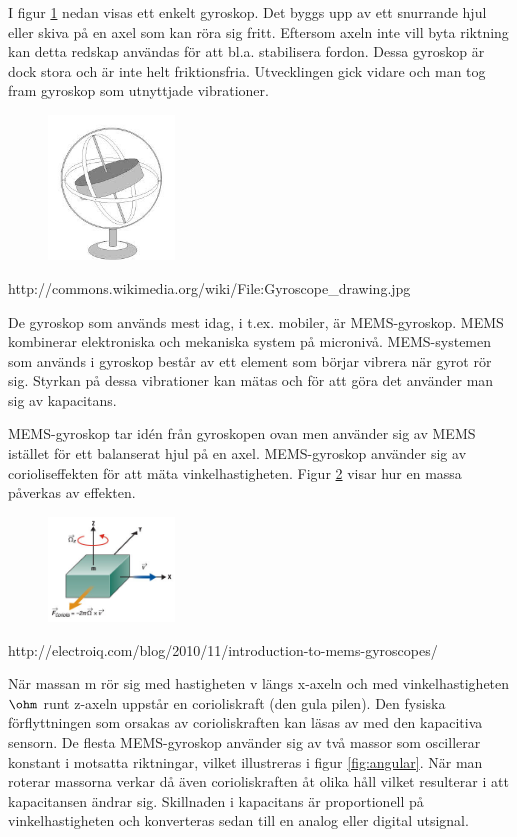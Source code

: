 \documentclass[a4paper,12pt,fleqn]{article}
\begin{document}
I figur \ref{fig:gyro} nedan visas ett enkelt gyroskop. Det byggs upp av ett snurrande hjul eller skiva på en axel som kan röra sig fritt. Eftersom axeln inte vill byta riktning kan detta redskap användas för att bl.a. stabilisera fordon. Dessa gyroskop är dock stora och är inte helt friktionsfria. Utvecklingen gick vidare och man tog fram gyroskop som utnyttjade vibrationer.

\begin{figure}[h]
\label{fig:gyro}
\caption{}
\includegraphics[width=0.3\textwidth]
{gyro.jpeg}
\end{figure}
http://commons.wikimedia.org/wiki/File:Gyroscope_drawing.jpg

De gyroskop som används mest idag, i t.ex. mobiler, är MEMS-gyroskop. MEMS kombinerar elektroniska och mekaniska system på micronivå. MEMS-systemen som används i gyroskop består av ett element som börjar vibrera när gyrot rör sig. Styrkan på dessa vibrationer kan mätas och för att göra det använder man sig av kapacitans.

MEMS-gyroskop tar idén från gyroskopen ovan men använder sig av MEMS istället för ett balanserat hjul på en axel. MEMS-gyroskop använder sig av corioliseffekten för att mäta vinkelhastigheten. Figur \ref{fig:coriolis} visar hur en massa påverkas av effekten.
\begin{figure}[h]
\label{fig:coriolis}
\caption{}
\includegraphics[width=0.3\textwidth]
{coriolis.png}
\end{figure}
http://electroiq.com/blog/2010/11/introduction-to-mems-gyroscopes/


När massan m rör sig med hastigheten v längs x-axeln och med vinkelhastigheten \begin{math}\ohm\end{math} runt z-axeln uppstår en corioliskraft (den gula pilen). Den fysiska förflyttningen som orsakas av corioliskraften kan läsas av med den kapacitiva sensorn. De flesta MEMS-gyroskop använder sig av två massor som oscillerar konstant i motsatta riktningar, vilket illustreras i figur \ref{fig:angular}. När man roterar massorna verkar då även corioliskraften åt olika håll vilket resulterar i att kapacitansen ändrar sig. Skillnaden i kapacitans är proportionell på vinkelhastigheten och konverteras sedan till en analog eller digital utsignal.
\end{document}
